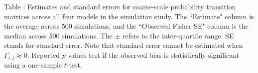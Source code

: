 \documentclass{article}
\begin{document}
        \noindent Table : Estimates and standard errors for coarse-scale probability transition matrices across all four models in the simulation study. The ``Estimate" column is the average across 500 simulations, and the ``Observed Fisher SE" column is the median across 500 simulations. The $\pm$ refers to the inter-quartile range. SE stands for standard error. Note that standard error cannot be estimated when $\Gamma_{i,j} \approx 0$. Reported $p$-values test if the observed bias is statistically significant using a one-sample $t$-test.
        \addtocounter{tablenum}{1}
        
        \newpage
        
        \begin{center}
\end{center}
\end{document}
